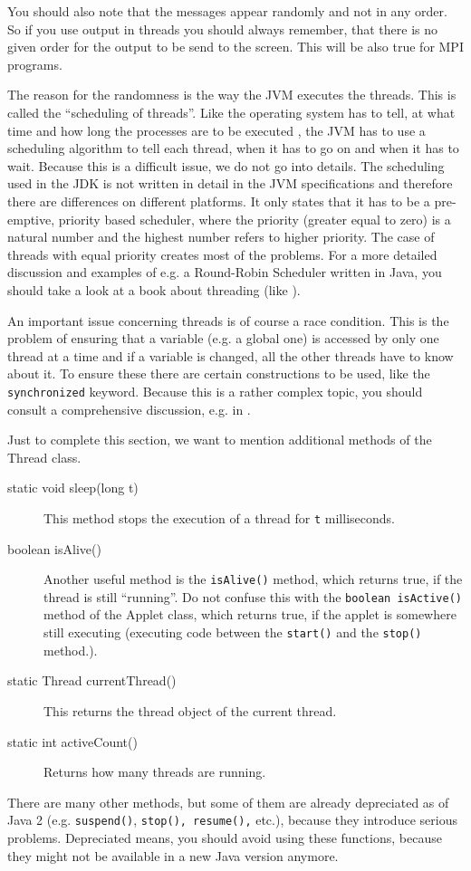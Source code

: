You should also note that the messages appear randomly and not in
any order. So if you use output in threads you should always remember,
that there is no given order for the output to be send to the screen. This
will be also true for MPI programs.

The reason for the randomness is the way the JVM executes the threads.
This is called the ``scheduling of threads''. Like the operating
system has to tell, at what time
and how long the processes are to be executed ,
the JVM has to use a scheduling algorithm to tell each
thread, when it has to go on and when it has to wait. Because this
is a difficult issue, we do not go into details. The scheduling used
in the JDK is not written in detail in the JVM specifications and therefore 
there
are differences on different platforms. It only states that it
has to be a pre-emptive, priority based scheduler, where the priority
(greater equal to zero) is a natural number and the highest number
refers to higher priority. The case of threads with equal priority
creates most of the problems. For a more detailed discussion and examples
of e.g. a Round-Robin Scheduler written in Java,
you should take a look at a book about threading (like \cite[]{JavaThreads}).
 
An important issue concerning threads is of course a race condition. This 
is the problem of ensuring that a variable (e.g. a global one) is
accessed by only one thread at a time and if a variable is changed,
all the other threads have to know about it. To ensure these there
are certain constructions to be used, like the \verb|synchronized| keyword.
Because this is a rather complex topic, you should consult a 
comprehensive discussion, e.g. in \cite[]{JavaThreads}.   

Just to complete this section, we want to mention additional methods of
the Thread class. 
\begin{description}
\item[static void sleep(long t)] This method stops the execution of a 
  thread for \verb|t| milliseconds.
\item[boolean isAlive()] Another useful method is the \verb|isAlive()| method, which 
returns true, if the thread is still ``running''. Do not confuse this
with  the \verb|boolean isActive()| method of the Applet class, which
returns true, if the applet is somewhere still executing (executing
code between the \verb|start()| and the \verb|stop()| method.).
\item[static Thread currentThread()] This returns the thread object of the current
  thread.
\item[static int activeCount()] Returns how many threads are running.
\end{description}
There are many other methods, but some of them are already depreciated as of
Java 2 (e.g. \verb|suspend()|, \verb|stop(), resume(),| etc.), 
because they introduce serious problems. Depreciated means, you should avoid 
using these functions, because they might not be available in a new Java 
version anymore.

